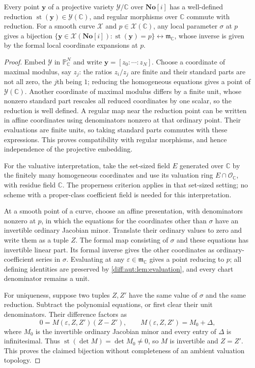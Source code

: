 \documentclass[11pt,letterpaper]{article}
\numberwithin{equation}{section}
\theoremstyle{definition}
\theoremstyle{remark}
\newcommand{\SC}{\mathbf{No}[i]}
\newcommand{\C}{\mathbb C}
\newcommand{\Ofin}{\mathcal O}
\newcommand{\mm}{\mathfrak m}
\newcommand{\st}{\operatorname{st}}
\begin{document}
\begin{lemma}
\label{diff:aut:lem:projective}
Every point $\mathbf y$ of a projective variety $\mathcal Y/\C$ over $\SC$ has a
well-defined reduction $\st(\mathbf y)\in\mathcal Y(\C)$, and regular morphisms
over $\C$ commute with reduction. For a smooth curve $\mathcal X$ and
$p\in\mathcal X(\C)$, any local parameter $\sigma$ at $p$ gives a bijection
$\{\mathbf y\in\mathcal X(\SC):\st(\mathbf y)=p\}\leftrightarrow\mm_{\C}$, whose
inverse is given by the formal local coordinate expansions at $p$.
\end{lemma}
\begin{proof}
Embed $\mathcal Y$ in $\mathbb P^{N}_{\C}$ and write $\mathbf y=[z_{0}:\cdots:z_{N}]$.
Choose a coordinate of maximal modulus, say $z_{j}$: the ratios $z_{i}/z_{j}$ are
finite and their standard parts are not all zero, the $j$th being $1$; reducing
the homogeneous equations gives a point of $\mathcal Y(\C)$. Another coordinate
of maximal modulus differs by a finite unit, whose nonzero standard part
rescales all reduced coordinates by one scalar, so the reduction is well
defined. A regular map near the reduction point can be written in
affine coordinates using denominators nonzero at that ordinary point.
Their evaluations are finite units, so taking standard parts commutes
with these expressions. This proves compatibility with regular
morphisms, and hence independence of the projective embedding.

For the valuative interpretation, take the set-sized field $E$
generated over $\C$ by the finitely many homogeneous coordinates and
use its valuation ring $E\cap\Ofin_{\C}$, with residue field $\C$.
The properness criterion \cite[Tag~0BX5]{Stacks} applies in that
set-sized setting; no scheme with a proper-class coefficient field is
needed for this interpretation.

At a smooth point of a curve, choose an affine presentation, with
denominators nonzero at $p$, in which the equations for the coordinates
other than $\sigma$ have an invertible ordinary Jacobian minor.
Translate their ordinary values to zero and write them as a tuple
$Z$. The formal map consisting of $\sigma$ and these equations has
invertible linear part. Its formal inverse gives the other coordinates
as ordinary-coefficient series in $\sigma$. Evaluating at any
$\varepsilon\in\mm_{\C}$ gives a point reducing to $p$; all defining
identities are preserved by \cref{diff:aut:lem:evaluation}, and every
chart denominator remains a unit.

For uniqueness, suppose two tuples $Z,Z'$ have the same value of
$\sigma$ and the same reduction. Subtract the polynomial equations,
or first clear their unit denominators. Their difference factors as
\[
 0=M(\varepsilon,Z,Z')(Z-Z'),
 \qquad M(\varepsilon,Z,Z')=M_0+\Delta,
\]
where $M_0$ is the invertible ordinary Jacobian minor and every entry
of $\Delta$ is infinitesimal. Thus
$\st(\det M)=\det M_0\neq0$, so $M$ is invertible and $Z=Z'$.
This proves the claimed bijection without completeness of an ambient
valuation topology.
\end{proof}
\end{document}
